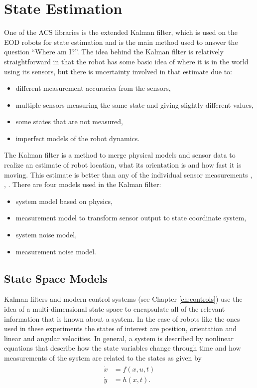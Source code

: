 \chapter{State Estimation}
\label{ch:estimation}
One of the ACS libraries is the extended Kalman filter, which is used on the EOD robots for state estimation and is the main method used to answer the question ``Where am I?''. The idea behind the Kalman filter is relatively straightforward in that the robot has some basic idea of where it is in the world using its sensors, but there is uncertainty involved in that estimate due to:
\begin{itemize}
\item different measurement accuracies from the sensors,
\item multiple sensors measuring the same state and giving slightly different values,
\item some states that are not measured,
\item imperfect models of the robot dynamics.
\end{itemize}

The Kalman filter is a method to merge physical models and sensor data to realize an estimate of robot location, what its orientation is and how fast it is moving. This estimate is better than any of the individual sensor measurements \cite{Simon06OptimalEstimation}, \cite{Grewal08}, \cite{Orderud05}. There are four models used in the Kalman filter:
\begin{itemize}
\item system model based on physics,
\item measurement model to transform sensor output to state coordinate system,
\item system noise model,
\item measurement noise model.
\end{itemize}

\section{State Space Models}
\label{sec:statespacemodels}
Kalman filters and modern control systems (see Chapter \ref{ch:controls}) use the idea of a multi-dimensional state space to encapsulate all of the relevant information that is known about a system. In the case of robots like the ones used in these experiments the states of interest are position, orientation and linear and angular velocities. In general, a system is described by nonlinear equations that describe how the state variables change through time and how measurements of the system are related to the states as given by
\begin{align}
\label{eq:statespace}
\begin{split}
\dot{x} &= f(x,u,t) \\
\dot{y} &= h(x,t).
\end{split}
\end{align}

